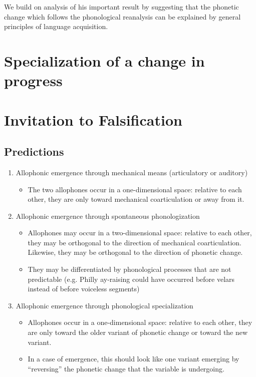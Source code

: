We build on \citet{fruehwald2013} analysis of his important result by suggesting that the phonetic change which follows the phonological reanalysis can be explained by general principles of language acquisition.

\section{Specialization of a change in progress}
\label{newzea}







\section{Invitation to Falsification}
\label{test}

\subsection{Predictions}
\begin{enumerate}
\item Allophonic emergence through mechanical means (articulatory or auditory)
	\begin{itemize}
		\item The two allophones occur in a one-dimensional space: relative to each other, they are only toward mechanical coarticulation or away from it.
	\end{itemize}
\item Allophonic emergence through spontaneous phonologization
	\begin{itemize}
		\item Allophones may occur in a two-dimensional space: relative to each other, they may be orthogonal to the direction of mechanical coarticulation. Likewise, they may be orthogonal to the direction of phonetic change.
		\item They may be differentiated by phonological processes that are not predictable (e.g. Philly ay-raising could have occurred before velars instead of before voiceless segments)
	\end{itemize}
\item Allophonic emergence through phonological specialization
	\begin{itemize}
		\item Allophones occur in a one-dimensional space: relative to each other, they are only toward the older variant of phonetic change or toward the new variant.
		\item In a case of emergence, this should look like one variant emerging by ``reversing'' the phonetic change that the variable is undergoing.
	\end{itemize}
\end{enumerate}

